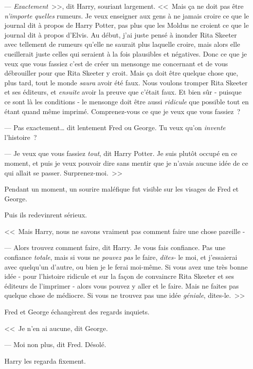 --- \emph{Exactement}~>>, dit Harry, souriant largement. <<~Mais ça ne doit pas être \emph{n'importe quelles} rumeurs. Je veux enseigner aux gens à ne jamais croire ce que le journal dit à propos de Harry Potter, pas plus que les Moldus ne croient ce que le journal dit à propos d'Elvis. Au début, j'ai juste pensé à inonder Rita Skeeter avec tellement de rumeurs qu'elle ne saurait plus laquelle croire, mais alors elle cueillerait juste celles qui seraient à la fois plausibles et négatives. Donc ce que je veux que vous fassiez c'est de créer un mensonge me concernant et de vous débrouiller pour que Rita Skeeter y croit. Mais ça doit être quelque chose que, plus tard, tout le monde \emph{saura} avoir été faux. Nous voulons tromper Rita Skeeter et ses éditeurs, et \emph{ensuite} avoir la preuve que c'était faux. Et bien sûr - puisque ce sont là les conditions - le mensonge doit être aussi \emph{ridicule} que possible tout en étant quand même imprimé. Comprenez-vous ce que je veux que vous fassiez~?

--- Pas exactement… dit lentement Fred ou George. Tu veux qu'on \emph{invente} l'histoire~?

--- Je veux que vous fassiez \emph{tout}, dit Harry Potter. Je suis plutôt occupé en ce moment, et puis je veux pouvoir dire sans mentir que je n'avais aucune idée de ce qui allait se passer. Surprenez-moi.~>>

Pendant un moment, un sourire maléfique fut visible sur les visages de Fred et George.

Puis ils redevinrent sérieux.

<<~Mais Harry, nous ne savons vraiment pas comment faire une chose pareille -

--- Alors trouvez comment faire, dit Harry. Je vous fais confiance. Pas une confiance \emph{totale}, mais si vous ne \emph{pouvez pas} le faire, \emph{dites-} le moi, et j'essaierai avec quelqu'un d'autre, ou bien je le ferai moi-même. Si vous avez une très bonne idée - pour l'histoire ridicule et sur la façon de convaincre Rita Skeeter et ses éditeurs de l'imprimer - alors vous pouvez y aller et le faire. Mais ne faites pas quelque chose de médiocre. Si vous ne trouvez pas une idée \emph{géniale}, dites-le.~>>

Fred et George échangèrent des regards inquiets.

<<~Je n'en ai aucune, dit George.

--- Moi non plus, dit Fred. Désolé.

Harry les regarda fixement.


